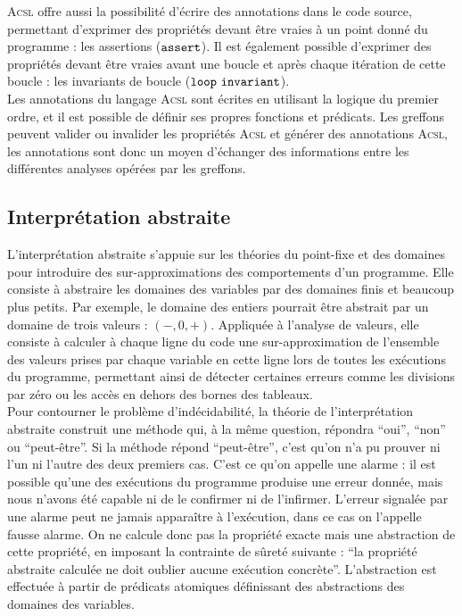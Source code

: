 \textsc{Acsl} offre aussi la possibilité d'écrire des annotations dans le code
source, permettant d'exprimer des propriétés devant être vraies à un point donné
du programme : les assertions (${\tt assert}$).
Il est également possible d'exprimer des propriétés devant être vraies avant une
boucle et après chaque itération de cette boucle : les invariants de boucle
(${\tt loop\ invariant}$).\\


Les annotations du langage \textsc{Acsl} sont écrites en utilisant la logique
du premier ordre, et il est possible de définir ses propres fonctions et
prédicats.
Les greffons peuvent valider ou invalider les propriétés \textsc{Acsl} et
générer des annotations \textsc{Acsl}, les annotations sont donc un moyen
d'échanger des informations entre les différentes analyses opérées par les
greffons.



\subsection{Interprétation abstraite}
\label{sec:interpretation-abstraite}

L'interprétation abstraite \cite{abstract-interpretation} s'appuie sur les
théories du point-fixe et des domaines pour introduire des sur-approximations
des comportements d'un programme. Elle consiste à abstraire les domaines des
variables par des domaines finis et beaucoup plus petits. Par exemple, le
domaine des entiers pourrait être abstrait par un domaine de trois valeurs :
$(-, 0, +)$. Appliquée à l’analyse de valeurs, elle consiste à calculer à
chaque ligne du code une sur-approximation de l’ensemble des valeurs prises par
chaque variable en cette ligne lors de toutes les exécutions du programme,
permettant ainsi de détecter certaines erreurs comme les divisions par zéro ou
les accès en dehors des bornes des tableaux.\\

Pour contourner le problème d’indécidabilité, la théorie de l’interprétation
abstraite construit une méthode qui, à la même question, répondra ``oui'',
``non'' ou ``peut-être''. Si la méthode répond ``peut-être'', c’est qu’on n’a pu
prouver ni l’un ni l’autre des deux premiers cas. C’est ce qu’on appelle une
alarme : il est possible qu’une des exécutions du programme produise une erreur
donnée, mais nous n’avons été capable ni de le confirmer ni de l’infirmer.
L’erreur signalée par une alarme peut ne jamais apparaître à l’exécution, dans
ce cas on l’appelle fausse alarme. On ne calcule donc pas la propriété exacte
mais une abstraction de cette propriété, en imposant la contrainte de sûreté
suivante : ``la propriété abstraite calculée ne doit oublier aucune exécution
concrète''. L'abstraction est effectuée à partir de prédicats atomiques
définissant des abstractions des domaines des variables.\\

